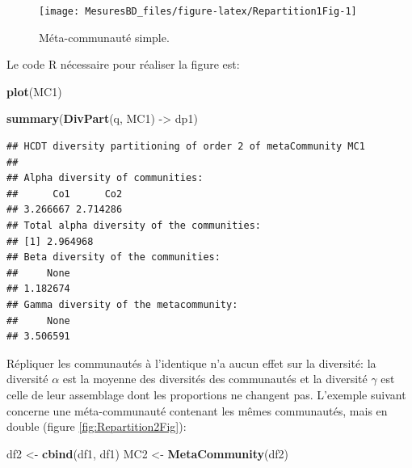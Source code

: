 \documentclass[
  11pt,
  french,
  a4paper,
  extrafontsizes,onecolumn,openright
  ]{memoir}
\newenvironment{Shaded}{\begin{snugshade}}{\end{snugshade}}
\newcommand{\FunctionTok}[1]{\textcolor[rgb]{0.13,0.29,0.53}{\textbf{#1}}}
\newcommand{\NormalTok}[1]{#1}
\newcommand{\OtherTok}[1]{\textcolor[rgb]{0.56,0.35,0.01}{#1}}
\begin{document}
\normalsize

\scriptsize

\begin{figure}

{\centering \texttt{[image: MesuresBD\_files/figure-latex/Repartition1Fig-1]} 

}

\caption{Méta-communauté simple.}\label{fig:Repartition1Fig}
\end{figure}

\normalsize

Le code R nécessaire pour réaliser la figure est:

\scriptsize

\begin{Shaded}
\begin{Highlighting}[]
\FunctionTok{plot}\NormalTok{(MC1)}
\end{Highlighting}
\end{Shaded}

\normalsize

\scriptsize

\begin{Shaded}
\begin{Highlighting}[]
\FunctionTok{summary}\NormalTok{(}\FunctionTok{DivPart}\NormalTok{(q, MC1) }\OtherTok{{-}\textgreater{}}\NormalTok{ dp1)}
\end{Highlighting}
\end{Shaded}

\begin{verbatim}
## HCDT diversity partitioning of order 2 of metaCommunity MC1
## 
## Alpha diversity of communities: 
##      Co1      Co2 
## 3.266667 2.714286 
## Total alpha diversity of the communities: 
## [1] 2.964968
## Beta diversity of the communities: 
##     None 
## 1.182674 
## Gamma diversity of the metacommunity: 
##     None 
## 3.506591
\end{verbatim}

\normalsize

Répliquer les communautés à l'identique n'a aucun effet sur la diversité: la diversité \(\alpha\) est la moyenne des diversités des communautés et la diversité \(\gamma\) est celle de leur assemblage dont les proportions ne changent pas.
L'exemple suivant concerne une méta-communauté contenant les mêmes communautés, mais en double (figure \ref{fig:Repartition2Fig}):

\scriptsize

\begin{Shaded}
\begin{Highlighting}[]
\NormalTok{df2 }\OtherTok{\textless{}{-}} \FunctionTok{cbind}\NormalTok{(df1, df1)}
\NormalTok{MC2 }\OtherTok{\textless{}{-}} \FunctionTok{MetaCommunity}\NormalTok{(df2)}
\end{Highlighting}
\end{Shaded}
\end{document}
